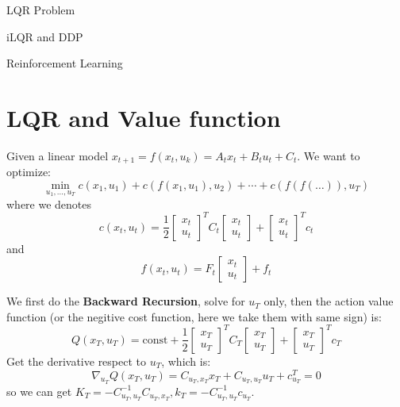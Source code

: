 \documentclass[10pt]{elegantbook}
\begin{document}
\begin{introduction}
    \item LQR Problem
    \item iLQR and DDP
    \item Reinforcement Learning
\end{introduction}

\section{LQR and Value function}

Given a linear model $x_{t+1} = f(x_t, u_k) = A_t x_t + B_t u_t + C_t$. We want to optimize:
\[ \min_{u_1, \ldots, u_T} c(x_1, u_1) + c(f(x_1, u_1), u_2) + \cdots + c(f(f(\ldots)), u_T) \]
where we denotes 
\[ c(x_t, u_t) = \frac{1}{2} 
\begin{bmatrix}
    x_t \\ 
    u_t
\end{bmatrix}^T C_t 
\begin{bmatrix}
    x_t \\ 
    u_t
\end{bmatrix}
+
\begin{bmatrix}
    x_t \\ 
    u_t
\end{bmatrix}^T c_t
\]
and 
\[ f(x_t, u_t) 
= F_t
\begin{bmatrix}
    x_t \\ 
    u_t
\end{bmatrix}
+ f_t
\]

We first do the \textbf{Backward Recursion}, solve for $u_T$ only, then the action value function (or the negitive cost function, here
we take them with same sign) is:
\[ Q(x_T, u_T) = \text{const} +
\frac{1}{2} 
\begin{bmatrix}
    x_T \\ 
    u_T
\end{bmatrix}^T C_T
\begin{bmatrix}
    x_T \\ 
    u_T
\end{bmatrix} + 
\begin{bmatrix}
    x_T \\ 
    u_T
\end{bmatrix}^T c_T
\]
Get the derivative respect to $u_T$, which is:
\[ \nabla_{u_T} Q(x_T, u_T) = C_{u_T, x_T}x_T + C_{u_T,u_T}u_T + c_{u_T}^T = 0 \]
so we can get $K_T = -C_{u_T,u_T}^{-1}C_{u_T, x_T}, k_T = -C_{u_T,u_T}^{-1}c_{u_T}$.
\end{document}

